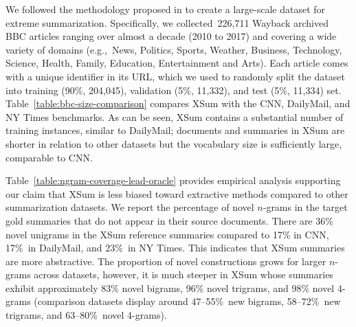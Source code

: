 


We followed the methodology proposed in  to
create a large-scale dataset for extreme summarization. Specifically,
we collected~226,711 Wayback archived BBC articles ranging over almost
a decade (2010 to 2017) and covering a wide variety of domains
(e.g.,~News, Politics, Sports, Weather, Business, Technology, Science,
Health, Family, Education, Entertainment and Arts). Each article comes
with a unique identifier in its URL, which we used to randomly split
the dataset into training (90\%, 204,045), validation (5\%, 11,332),
and test (5\%, 11,334) set. Table~\ref{table:bbc-size-comparison}
compares XSum with the CNN, DailyMail, and NY Times %
benchmarks. As can be seen, XSum contains a substantial number of
training instances, similar to DailyMail; documents and summaries in
XSum are shorter in relation to other datasets but the vocabulary size
is sufficiently large, comparable to CNN.


Table~\ref{table:ngram-coverage-lead-oracle} provides empirical
analysis supporting our claim that XSum is less biased toward
extractive methods compared to other summarization datasets.  We
report the percentage of novel $n$-grams in the target gold summaries
that do not appear in their source documents.  There are 36\% novel
unigrams in the XSum reference summaries compared to 17\% in CNN,
17\%~in DailyMail, and 23\%~in NY Times. %
This indicates that XSum summaries are more abstractive. The
proportion of novel constructions grows for larger $n$-grams across
datasets, however, it is much steeper in XSum whose summaries exhibit
approximately 83\% novel bigrams, 96\% novel trigrams, and 98\% novel
4-grams (comparison datasets display around 47--55\%~new bigrams,
58--72\%~new trigrams, and 63--80\%~novel 4-grams).

